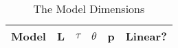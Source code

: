 \newcommand{\nimLine}[6]{{#1}&{#2}&{#3}&{#4}&{#5}&{#6}\\}  
\begin{table}
  \begin{center}
\begin{tabular}{|l|r|r|r|r|c|}
\hline
\multicolumn{1}{|c|}{Model}&  
\multicolumn{1}{|c|}{L}&  
\multicolumn{1}{|c|}{$\tau$}&  
\multicolumn{1}{|c|}{$\theta$}&  
\multicolumn{1}{|c|}{p}&
\multicolumn{1}{|c|}{Linear?}\\
\hline

\hline
\end{tabular}
  \caption{The Model Dimensions }
  \label{tab:noEst}

    
  \end{center}
\end{table}

